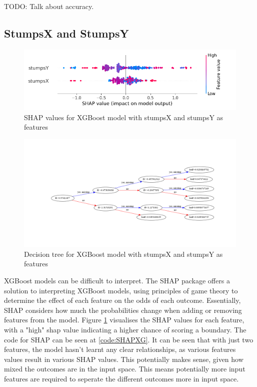 \documentclass[12pt,a4paper]{report}
\theoremstyle{definition}
\begin{document}
TODO: Talk about accuracy.

\subsection{StumpsX and StumpsY}

\begin{figure}[H]
    \centering
    \includegraphics[width=\linewidth]{shap_stumps.png}
    \caption{SHAP values for XGBoost model with stumpsX and stumpsY as features}
    \label{fig:ShapStumps}
\end{figure}

\begin{figure}[H]
    \centering
    \includegraphics[width=\linewidth]{tree_stumps.png}
    \caption{Decision tree for XGBoost model with stumpsX and stumpsY as features}
    \label{fig:TreeStumps}
\end{figure}

XGBoost models can be difficult to interpret. 
The SHAP package offers a solution to interpreting XGBoost models, using principles of game theory to determine the effect of each feature on the odds of each outcome.
Essentially, SHAP considers how much the probabilities change when adding or removing features from the model.
Figure \ref{fig:ShapStumps} visualises the SHAP values for each feature, with a "high" shap value indicating a higher chance of scoring a boundary.
The code for SHAP can be seen at \ref{code:SHAPXG}.
It can be seen that with just two features, the model hasn't learnt any clear relationships, as various features values result in various SHAP values.
This potentially makes sense, given how mixed the outcomes are in the input space.
This means potentially more input features are required to seperate the different outcomes more in input space.
\end{document}
